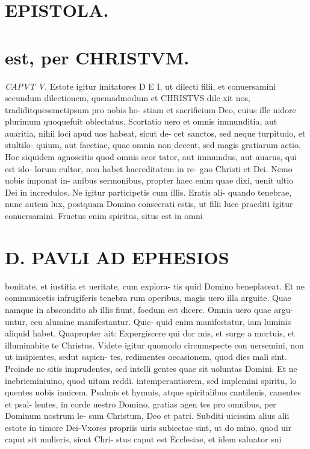 \documentclass{article}
\begin{document}
\begin{pages}
\section*{EPISTOLA.  }
\section*{est, per CHRISTVM.  }
\marginpar{[ p.u ]}
\marginpar{[ p.1.  ]}
\marginpar{[ p.2.  ]}
\marginpar{[ p.3.  ]}
\marginpar{[ p.4.  ]}
\marginpar{[ p.5.  ]}
\textit{CAPVT V.  }\pstart Estote igitur imitatores D E I, ut dilecti filii, et conuersamini secundum dilectionem, quemadmodum et CHRISTVS dile xit nos, tradiditquesemetipsum pro nobis ho- stiam et sacrificium Deo, cuius ille nidore plurimum quoquefuit oblectatus.  \pend\pstart Scortatio uero et omnis immunditia, aut auaritia, nihil loci apud uos habeat, sicut de- cet sanctos, sed neque turpitudo, et stultilo- quium, aut facetiae, quae omnia non decent, sed magis gratiarum actio.  \pend\pstart Hoc siquidem agnoscitis quod omnis scor tator, aut immundus, aut auarus, qui est ido- lorum cultor, non habet haereditatem in re- gno Christi et Dei. Nemo uobis imponat in- anibus sermonibus, propter haec enim quae dixi, uenit ultio Dei in incredulos.  \pend\pstart Ne igitur participetis cum illis. Eratis ali- quando tenebrae, nunc autem lux, postquam Domino consecrati estis, ut filii luce praediti igitur conuersamini.  \pend\pstart Fructus enim spiritus, situs est in omni  \pend
\section*{D. PAVLI AD EPHESIOS }
\marginpar{[ p.6.  ]}
\marginpar{[ p.7.  ]}
\marginpar{[ p.8.  ]}
\marginpar{[ p.9.  ]}\pstart bonitate, et iustitia et ueritate, cum explora- tis quid Domino beneplaceat.  \pend\pstart Et ne communicetis infrugiferis tenebra rum operibus, magis uero illa arguite. Quae namque in abscondito ab illis fiunt, foedum est dicere. Omnia uero quae argu- untur, ceu alumine manifestantur. Quic- quid enim manifestatur, iam luminis aliquid habet. Quapropter ait: Expergiscere qui dor mis, et surge a mortuis, et illuminabite te Christus.  \pend\pstart Videte igitur quomodo circumspecte con uersemini, non ut insipientes, sedut sapien- tes, redimentes occasionem, quod dies mali sint. Proinde ne sitis imprudentes, sed intelli gentes quae sit uoluntas Domini.  \pend\pstart Et ne inebrieminiuino, quod uitam reddi. intemperantiorem, sed implemini spiritu, lo quentes uobis inuicem, Psalmis et hymnis, atque spiritalibus cantilenis, canentes et psal- lentes, in corde uestro Domino, gratias agen tes pro omnibus, per Dominum nostrum le- sum Christum, Deo et patri.  \pend\pstart Subditi uicissim alius alii estote in timore Dei-Vxores propriis uiris subiectae sint, ut do mino, quod uir caput sit mulieris, sicut Chri- stus caput est Ecclesiae, et idem saluator sui  \pend

\end{pages}
\end{document}
